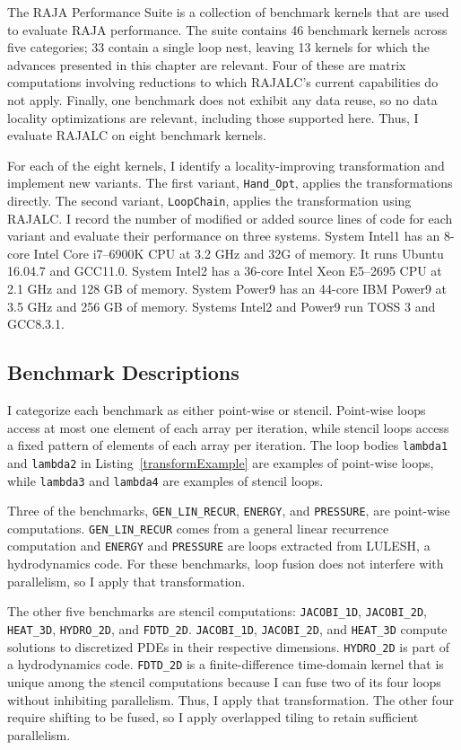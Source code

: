 The RAJA Performance Suite is a collection of benchmark kernels that are
used to evaluate RAJA performance.
The suite contains 46 benchmark kernels across five categories; 33 contain
a single loop nest, leaving 13 kernels for which the advances presented in this chapter are relevant.
Four of these are matrix computations involving reductions to which 
RAJALC's current capabilities do not apply. 
Finally, one benchmark does not exhibit any data reuse, so no data locality 
optimizations are relevant, including those supported here. 
Thus, I evaluate RAJALC on eight benchmark kernels.

For each of the eight kernels, I identify a locality-improving transformation
and implement new variants.
The first variant, \verb.Hand_Opt., applies the transformations directly.
The second variant, \verb.LoopChain., applies the transformation using RAJALC\@.
I record the number of modified or added source lines of code for each
variant and evaluate their performance on three systems.
System Intel1 has an 8-core Intel Core i7--6900K CPU at 3.2 GHz and 32G of memory.
It runs Ubuntu 16.04.7 and GCC11.0.
System Intel2 has a 36-core Intel Xeon E5--2695 CPU at 2.1 GHz and 128 GB of memory.
System Power9 has an 44-core IBM Power9 at 3.5 GHz and 256 GB of memory.
Systems Intel2 and Power9 run TOSS 3 and GCC8.3.1.


\subsection{Benchmark Descriptions}

I categorize each benchmark as either point-wise or stencil. 
Point-wise loops access at most one element of each array per iteration,
while stencil loops access a fixed pattern of elements of each array per
iteration. 
The loop bodies
\verb.lambda1. and \verb.lambda2. in Listing~\ref{transformExample} are
examples of point-wise loops, while \verb.lambda3. and \verb.lambda4. are
examples of stencil loops.

Three of the benchmarks, \verb.GEN_LIN_RECUR., \verb.ENERGY., and
\verb.PRESSURE., are point-wise computations.
\verb.GEN_LIN_RECUR. comes from a general linear recurrence computation and
\verb.ENERGY. and \verb.PRESSURE. are loops extracted from LULESH, a
hydrodynamics code. 
For these benchmarks, loop fusion does not interfere with parallelism, so
I apply that transformation.

The other five benchmarks are stencil computations: \verb.JACOBI_1D.,
\verb.JACOBI_2D., \verb.HEAT_3D., \verb.HYDRO_2D., and \verb.FDTD_2D..
\verb.JACOBI_1D., \verb.JACOBI_2D., and \verb.HEAT_3D. compute solutions
to discretized PDEs in their respective dimensions.
\verb.HYDRO_2D. is part of a hydrodynamics code.
\verb.FDTD_2D. is a finite-difference time-domain kernel that is unique
among the stencil computations because I can fuse two of its four loops 
without inhibiting parallelism.
Thus, I apply that transformation.
The other four require shifting to be fused, so I apply overlapped tiling
to retain sufficient parallelism.

